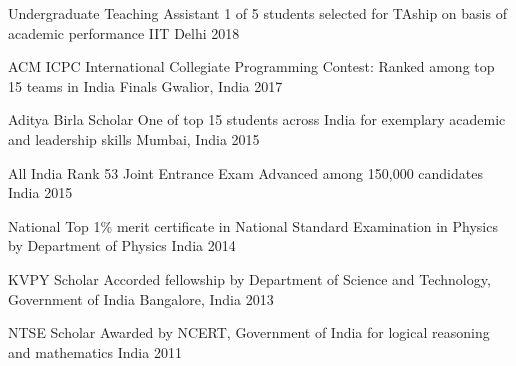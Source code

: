 



\begin{cvhonors}
  \cvhonor
    {Undergraduate Teaching Assistant} %
    {1 of 5 students selected for TAship on basis of academic performance} %
    {IIT Delhi} %
    {2018} %

  \cvhonor
    {ACM ICPC} %
    {International Collegiate Programming Contest: Ranked among top 15 teams in India Finals} %
    {Gwalior, India} %
    {2017} %

  \cvhonor
    {Aditya Birla Scholar} %
    {One of top 15 students across India for exemplary academic and leadership skills} %
    {Mumbai, India} %
    {2015} %

  \cvhonor
    {All India Rank 53} %
    {Joint Entrance Exam Advanced among 150,000 candidates} %
    {India} %
    {2015} %

  \cvhonor
    {National Top 1\%} %
    {merit certificate in National Standard Examination in Physics by Department of Physics} %
    {India} %
    {2014} %

  \cvhonor
    {KVPY Scholar} %
    {Accorded fellowship by Department of Science and Technology, Government of India} %
    {Bangalore, India} %
    {2013} %

  \cvhonor
    {NTSE Scholar} %
    {Awarded by NCERT, Government of India for logical reasoning and mathematics} %
    {India} %
    {2011} %

\end{cvhonors}


